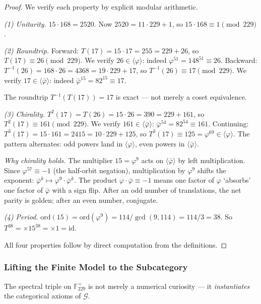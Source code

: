 \documentclass[12pt,oneside]{article}
\theoremstyle{principia}
\theoremstyle{definition}
\theoremstyle{remark}
\providecommand{\FF}{\mathbb{F}}
\providecommand{\GG}{\mathcal{G}}
\providecommand{\vp}{\varphi}
\providecommand{\vpbar}{\bar{\varphi}}
\begin{document}
\begin{proof}
We verify each property by explicit modular arithmetic.

\emph{(1) Unitarity.} $15 \cdot 168 = 2520$. Now $2520 = 11 \cdot 229 + 1$, so $15 \cdot 168 \equiv 1 \pmod{229}$.

\emph{(2) Roundtrip.} Forward: $T(17) = 15 \cdot 17 = 255 = 229 + 26$, so $T(17) \equiv 26 \pmod{229}$. We verify $26 \in \langle\vp\rangle$: indeed $\vp^{51} = 148^{51} \equiv 26$. Backward: $T^{-1}(26) = 168 \cdot 26 = 4368 = 19 \cdot 229 + 17$, so $T^{-1}(26) \equiv 17 \pmod{229}$. We verify $17 \in \langle\vpbar\rangle$: indeed $\vpbar^{15} = 82^{15} \equiv 17$.

The roundtrip $T^{-1}(T(17)) = 17$ is exact --- not merely a coset equivalence.

\emph{(3) Chirality.} $T^2(17) = T(26) = 15 \cdot 26 = 390 = 229 + 161$, so $T^2(17) \equiv 161 \pmod{229}$. We verify $161 \in \langle\vpbar\rangle$: $\vpbar^{54} = 82^{54} \equiv 161$. Continuing: $T^3(17) = 15 \cdot 161 = 2415 = 10 \cdot 229 + 125$, so $T^3(17) \equiv 125 = \vp^{69} \in \langle\vp\rangle$. The pattern alternates: odd powers land in $\langle\vp\rangle$, even powers in $\langle\vpbar\rangle$.

\emph{Why chirality holds.} The multiplier $15 = \vp^9$ acts on $\langle\vpbar\rangle$ by left multiplication. Since $\vp^{57} \equiv -1$ (the half-orbit negation), multiplication by $\vp^9$ shifts the exponent: $\vpbar^k \mapsto \vp^9 \cdot \vpbar^k$. The product $\vp \cdot \vpbar \equiv -1$ means one factor of $\vp$ `absorbs' one factor of $\vpbar$ with a sign flip. After an odd number of translations, the net parity is golden; after an even number, conjugate.

\emph{(4) Period.} $\mathrm{ord}(15) = \mathrm{ord}(\vp^9) = 114 / \gcd(9, 114) = 114/3 = 38$. So $T^{38} = \times 15^{38} = \times 1 = \mathrm{id}$.

All four properties follow by direct computation from the definitions. \qedhere
\end{proof}

\subsubsection*{Lifting the Finite Model to the Subcategory}

The spectral triple on $\FF_{229}^\times$ is not merely a numerical curiosity --- it \emph{instantiates} the categorical axioms of $\GG$.
\end{document}
